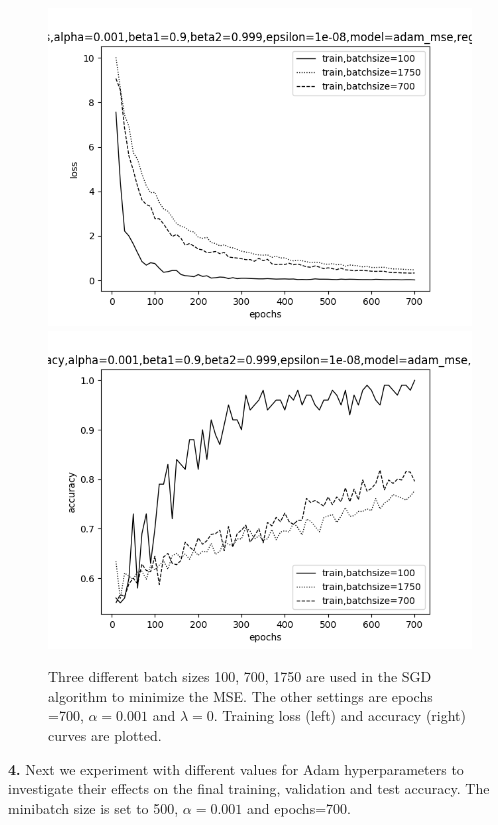 \documentclass[12pt]{article}
\newenvironment{problem}[2][Problem]{\begin{trivlist}
\item[\hskip \labelsep {\bfseries #1}\hskip \labelsep {\bfseries #2.}]}{\end{trivlist}}
\begin{document}
\begin{problem}{3}
\begin{figure}[!htb]
  \includegraphics[width=\linewidth]{images/a1/3.3/loss.png}
\endminipage\hfill
{}
  \includegraphics[width=\linewidth]{images/a1/3.3/accuracy.png}
\endminipage

\caption{Three different batch sizes 100, 700, 1750 are used in the SGD algorithm to minimize the MSE. The other settings are epochs =700, $\alpha=0.001$ and $\lambda=0$. Training loss (left) and accuracy (right) curves are plotted.}\label{fig:3-3}
\end{figure}

\bigskip
\bigskip
\bigskip
\textbf{4. } Next we experiment with different values for Adam hyperparameters to investigate their effects on the final training, validation and test accuracy. The minibatch size is set to 500,  $\alpha=0.001$ and epochs=700.


\end{problem}
\end{document}
